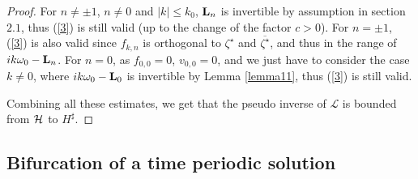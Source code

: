 \documentclass[11pt]{article}
\begin{document}
\begin{proof}
For $n \ne \pm 1$, $n \ne 0$ and $|k| \le k_0$, ${\bf L}_n$ is invertible
by assumption in section $2.1$, thus (\ref{3}) is still valid
(up to the change of the factor $c > 0$).
For $n = \pm 1$, (\ref{3}) is also valid since $f_{k,n}$ is orthogonal to $\zeta^\star$ and
$\overline{\zeta^\star}$, and thus in the range of $i k \omega_0 - {\bf L}_n$.
For $n = 0$, as $f_{0,0} = 0$, $v_{0,0} = 0$, and we just have to consider the case $k \ne 0$, where $i k \omega_0 - {\bf L}_0$
is invertible by Lemma \ref{lemma11}, thus (\ref{3}) is still valid.

Combining all these estimates, we get that the pseudo inverse of $\mathcal{L}$ is bounded from ${\cal H}$ to $H^\sharp$.
\end{proof}







\subsection{Bifurcation of a time periodic solution}

\end{document}
